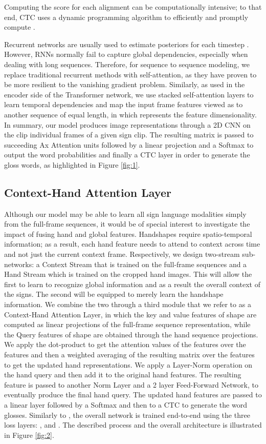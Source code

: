\documentclass[a4paper,conference]{IEEEtran}
\begin{document}
Computing the score for each alignment can be computationally intensive; to that end, CTC uses a dynamic programming algorithm to efficiently and promptly compute  \cite{hannun2017sequence}. 

Recurrent networks are usually used to estimate posteriors  for each timestep . However, RNNs normally fail to capture global dependencies, especially when dealing with long sequences. Therefore, for sequence to sequence modeling, we replace traditional recurrent methods with self-attention, as they have proven to be more resilient to the vanishing gradient problem. Similarly, as used in the encoder side of the Transformer network, we use stacked self-attention layers to learn temporal dependencies and map the input frame features viewed as   
to another sequence of equal length, in which  represents the feature dimensionality. In summary, our model produces image representations through a 2D CNN on the clip individual frames of a given sign clip. The resulting matrix is passed to succeeding Ax Attention units followed by a linear projection and a Softmax to output the word probabilities and finally a CTC layer in order to generate the gloss words, as highlighted in Figure \ref{fig:1}.


\subsection{Context-Hand Attention Layer}

Although our model may be able to learn all sign language modalities simply from the full-frame sequences, it would be of special interest to investigate the impact of fusing hand and global features. Handshapes require spatio-temporal information; as a result, each hand feature needs to attend to context across time and not just the current context frame.
Respectively, we design two-stream sub-networks: a Context Stream that is trained on the full-frame sequences and a Hand Stream which is trained on the cropped hand images. This will allow the first to learn to recognize global information and as a result the overall context of the signs. The second will be equipped to merely learn the handshape information. We combine the two through a third module that we refer to as a Context-Hand Attention Layer, in which the key and value features of shape  are computed as linear projections of the full-frame sequence representation, while the Query features  of shape  are obtained through the hand sequence projections. We apply the dot-product to get the attention values of the  features over the  features and then a weighted averaging of the resulting matrix over the  features to get the updated hand representations. We apply a Layer-Norm operation on the hand query and then add it to the original hand features. The resulting feature is passed to another Norm Layer and a 2 layer Feed-Forward Network, to eventually produce the final hand query. The updated hand features are passed to a linear layer followed by a Softmax and then to a CTC to generate the word glosses. Similarly to \cite{camgoz2017subunets}, the overall network is trained end-to-end using the three loss layers: ,  and . The described process and the overall architecture is illustrated in Figure \ref{fig:2}.
\end{document}
